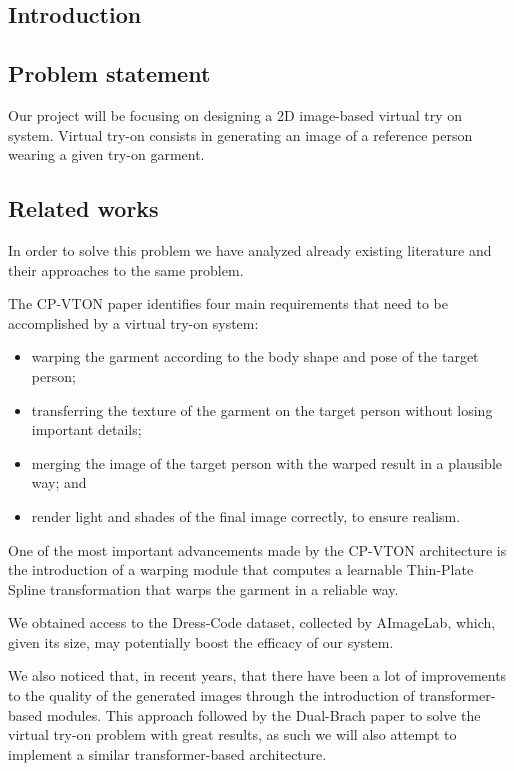 \begin{multicols}{2}
\tableofcontents
\section{Introduction}

\subsection{Problem statement}

Our project will be focusing on designing a 2D image-based virtual try on system. Virtual try-on consists in generating an image of a reference person wearing a given try-on garment. 

\subsection{Related works}
In order to solve this problem we have analyzed already existing literature and their approaches to the same problem.

The CP-VTON paper identifies four main requirements that need to be accomplished by a virtual try-on system:
\begin{itemize}
\item warping the garment according to the body shape and pose of the target person; 
\item transferring the texture of the garment on the target person without losing important details; 
\item merging the image of the target person with the warped result in a plausible way; and 
\item render light and shades of the final image correctly, to ensure realism.
\end{itemize}


One of the most important advancements made by the CP-VTON architecture is the introduction of a warping module that computes a learnable Thin-Plate Spline transformation that warps the garment in a reliable way.

We obtained access to the Dress-Code dataset, collected by AImageLab, which, given its size, may potentially boost the efficacy of our system.

We also noticed that, in recent years, that there have been a lot of improvements to the quality of the generated images through the introduction of transformer-based modules. 
This approach followed by the Dual-Brach paper to solve the virtual try-on problem with great results, as such we will also attempt to implement a similar transformer-based architecture. 


\end{multicols}
